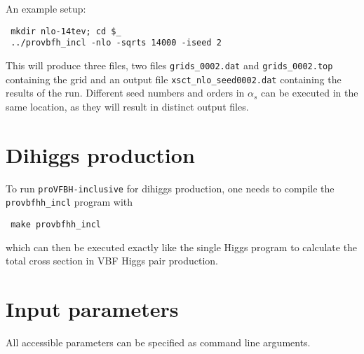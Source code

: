 \documentclass[12pt,a4]{article}
\newcommand{\provbfhincl}{\texttt{proVFBH-inclusive}\xspace}
\begin{document}
An example setup:
\begin{verbatim}
 mkdir nlo-14tev; cd $_
 ../provbfh_incl -nlo -sqrts 14000 -iseed 2
\end{verbatim}
This will produce three files, two files \texttt{grids\_0002.dat} and
\texttt{grids\_0002.top} containing the grid and an output file
\texttt{xsct\_nlo\_seed0002.dat} containing the results of the run.
%
Different seed numbers and orders in
$\alpha_s$ can be executed in the same location, as they will result
in distinct output files.

\section{Dihiggs production}
To run \provbfhincl for dihiggs production, one needs to compile the
\texttt{provbfhh\_incl} program with
\begin{verbatim}
 make provbfhh_incl
\end{verbatim}
which can then be executed exactly like the single Higgs program to
calculate the total cross section in VBF Higgs pair production.
\section{Input parameters}
All accessible parameters can be specified as command line arguments.
\end{document}
